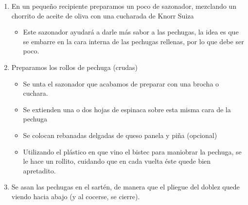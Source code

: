 \documentclass[letterpaper]{article}
\begin{document}
\begin{enumerate}
\item En un pequeño recipiente preparamos un poco de sazonador, mezclando un chorrito de aceite de oliva con una cucharada de Knorr Suiza
	\begin{itemize}
	\item Este sazonador ayudará a darle más sabor a las pechugas, la idea es que se embarre en la cara interna de las pechugas rellenas, por lo que debe ser poco.
	\end{itemize}
\item Preparamos los rollos de pechuga (crudas)
	\begin{itemize}
	\item  Se unta el sazonador que acabamos de preparar con una brocha o cuchara.
	\item  Se extienden una o dos hojas de espinaca sobre esta misma cara de la pechuga
	\item  Se colocan rebanadas delgadas de queso panela y piña (opcional)
	\item  Utilizando el plástico en que vino el bistec para maniobrar la pechuga, se le hace un rollito, cuidando que en cada vuelta éste quede bien apretadito.
	\end{itemize}
\item Se asan las pechugas en el sartén, de manera que el pliegue del doblez quede viendo hacia abajo (y al cocerse, se cierre).
\end{enumerate}
\end{document}
